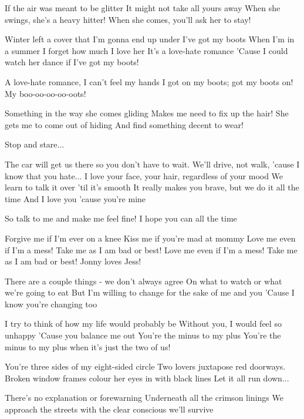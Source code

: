 If the air was meant to be glitter
It might not take all yours away
When she swings, she's a heavy hitter!
When she comes, you'll ask her to stay!

Winter left a cover that I'm gonna end up under
I've got my boots
When I'm in a summer I forget how much I love her
It's a love-hate romance
'Cause I could watch her dance if I've got my boots!

A love-hate romance, I can't feel my hands
I got on my boots; got my boots on!
My boo-oo-oo-oo-oots!

Something in the way she comes gliding
Makes me need to fix up the hair!
She gets me to come out of hiding
And find something decent to wear!

Stop and stare...


The car will get us there so you don't have to wait.
We'll drive, not walk, 'cause I know that you hate...
I love your face, your hair, regardless of your mood
We learn to talk it over 'til it's smooth
It really makes you brave, but we do it all the time
And I love you 'cause you're mine

So talk to me and make me feel fine!
I hope you can all the time

Forgive me if I'm ever on a knee
Kiss me if you're mad at mommy
Love me even if I'm a mess!
Take me as I am bad or best!
Love me even if I'm a mess! Take me as I am bad or best!
Jonny loves Jess!

There are a couple things - we don't always agree
On what to watch or what we're going to eat
But I'm willing to change for the sake of me and you
'Cause I know you're changing too

I try to think of how my life would probably be
Without you, I would feel so unhappy
'Cause you balance me out
You're the minus to my plus
You're the minus to my plus when it's just the two of us!


You're three sides of my eight-sided circle
Two lovers juxtapose red doorways.
Broken window frames colour her eyes in with black lines
Let it all run down...

There's no explanation or forewarning
Underneath all the crimson linings
We approach the streets with the clear conscious we'll survive


